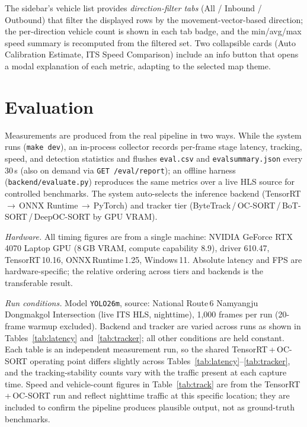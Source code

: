 \documentclass[conference]{IEEEtran}
\renewcommand{\_}{\textunderscore\allowbreak}
\begin{document}
The sidebar's vehicle list provides \emph{direction-filter tabs} (All / Inbound /
Outbound) that filter the displayed rows by the movement-vector-based direction; the
per-direction vehicle count is shown in each tab badge, and the min/avg/max speed
summary is recomputed from the filtered set. Two collapsible cards (Auto Calibration
Estimate, ITS Speed Comparison) include an info button that opens a modal explanation
of each metric, adapting to the selected map theme.

\section{Evaluation}\label{sec:eval}
Measurements are produced from the real pipeline in two ways. While the system runs
(\texttt{make dev}), an in-process collector records per-frame stage latency,
tracking, speed, and detection statistics and flushes \texttt{eval\_*.csv} and
\texttt{eval\_summary.json} every 30\,s (also on demand via \texttt{GET /eval/report});
an offline harness (\texttt{backend/evaluate.py}) reproduces the same metrics over a
live HLS source for controlled benchmarks. The system auto-selects the inference backend
(TensorRT\,$\to$\,ONNX Runtime\,$\to$\,PyTorch) and tracker tier (ByteTrack\,/\,OC-SORT\,/\,BoT-SORT\,/\,DeepOC-SORT by GPU VRAM).

\textit{Hardware.} All timing figures are from a single machine: NVIDIA GeForce
RTX\,4070 Laptop GPU (8\,GB VRAM, compute capability 8.9), driver 610.47,
TensorRT\,10.16, ONNX\,Runtime\,1.25, Windows\,11. Absolute latency and FPS are
hardware-specific; the relative ordering across tiers and backends is the
transferable result.

\textit{Run conditions.} Model \texttt{YOLO26m}, source: National Route\,6
Namyangju Dongmakgol Intersection (live ITS HLS, nighttime), 1{,}000 frames
per run (20-frame warmup excluded). Backend and tracker are varied across runs
as shown in Tables~\ref{tab:latency} and~\ref{tab:tracker}; all other
conditions are held constant. Each table is an independent measurement run, so the
shared TensorRT\,+\,OC-SORT operating point differs slightly across
Tables~\ref{tab:latency}--\ref{tab:tracker}, and the tracking-stability counts vary
with the traffic present at each capture time. Speed and vehicle-count figures in
Table~\ref{tab:track} are from the TensorRT\,+\,OC-SORT run and reflect
nighttime traffic at this specific location; they are included to confirm the
pipeline produces plausible output, not as ground-truth benchmarks.
\end{document}
